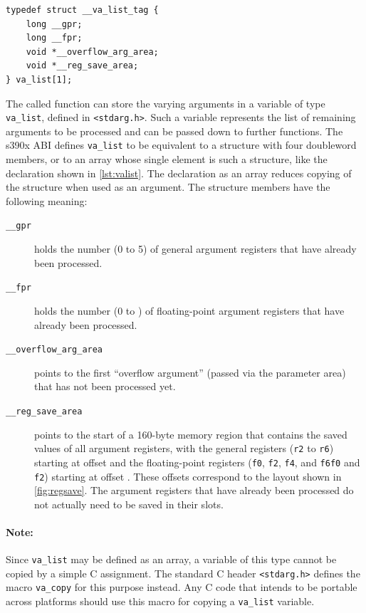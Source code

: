\documentclass[USenglish,fontsize=11pt,twoside,%
  toc=bib,toc=idx,toc=graduated,numbers=noendperiod,
  bookmarks=true,
  bookmarksnumbered=true,
  bookmarksopen=true,
  bookmarksopenlevel=1,
  breaklinks=true,
  colorlinks=true,
  linkcolor=black,
  pdfpagelayout={TwoPageRight},
  pdfusetitle=true
]{scrreprt}
\newcommand{\STACKSIZE}{160}
\newcommand{\ABINAME}{s390x}
\newcommand{\STACKSIZE}{96}
\newcommand{\ABINAME}{s390}
\begin{document}
\begin{lstlisting}[style=float,caption={\texttt{va\_list}
    declaration example},label={lst:valist}]
typedef struct __va_list_tag {
    long __gpr;
    long __fpr;
    void *__overflow_arg_area;
    void *__reg_save_area;
} va_list[1];
\end{lstlisting}

The called function can store the varying arguments in a variable of type
\texttt{va\_list}, defined in \texttt{<stdarg.h>}.  Such a variable
represents the list of remaining arguments to be processed and can be
passed down to further functions.  The \ABINAME{} ABI defines
\texttt{va\_list} to be equivalent to a structure with four {\ifzseries
  double\fi}word members, or to an array whose single element is such a
structure, like the declaration shown in \cref{lst:valist}.  The
declaration as an array reduces copying of the structure when used as an
argument.  The structure members have the following meaning:

\begin{description}
\item[\texttt{\_\_gpr}] holds the number (0 to 5) of general argument
  registers that have already been processed.
\item[\texttt{\_\_fpr}] holds the number (0 to {\fi})
  of floating-point argument registers that have already been processed.
\item[\texttt{\_\_overflow\_arg\_area}] points to the first ``overflow
  argument'' (passed via the parameter area) that has not been processed
  yet.
\item[\texttt{\_\_reg\_save\_area}] points to the start of a
  \STACKSIZE{}-byte memory region that contains the saved values of all
  argument registers, with the general registers (\texttt{r2} to
  \texttt{r6}) starting at offset {\fi} and the
  floating-point registers ({\ifzseries\texttt{f0}, \texttt{f2},
    \texttt{f4}, and \texttt{f6}\else \texttt{f0} and \texttt{f2}\fi})
  starting at offset {\fi}.  These offsets
  correspond to the layout shown in \cref{fig:regsave}.  The argument
  registers that have already been processed do not actually need to be
  saved in their slots.
\end{description}

\paragraph{Note:}
Since \texttt{va\_list} may be defined as an array, a variable of this
type cannot be copied by a simple C assignment.  The standard C header
\texttt{<stdarg.h>} defines the macro \texttt{va\_copy} for this purpose
instead.  Any C code that intends to be portable across platforms should
use this macro for copying a \texttt{va\_list} variable.
\end{document}
